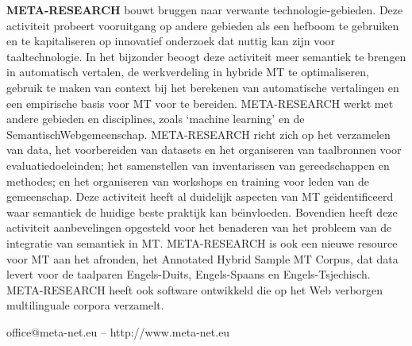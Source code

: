 \documentclass[]{../../metanetpaper}
\begin{document}
\begin{multicols}{2}
    \textbf{META-RESEARCH} bouwt bruggen naar verwante technologie-gebieden. Deze activiteit probeert vooruitgang op andere gebieden als een hefboom te gebruiken en te kapitaliseren op innovatief onderzoek dat nuttig kan zijn voor taaltechnologie. In het bijzonder beoogt deze activiteit meer semantiek te brengen in automatisch vertalen, de werkverdeling in hybride MT te optimaliseren, gebruik te maken van context bij het berekenen van automatische vertalingen en een empirische basis voor MT voor te bereiden. META-RESEARCH werkt met andere gebieden en disciplines, zoals `machine learning' en de SemantischWebgemeenschap. META-RESEARCH richt zich op het verzamelen van data, het voorbereiden van datasets en het organiseren van taalbronnen voor evaluatiedoeleinden; het samenstellen van inventarissen van gereedschappen en methodes; en het organiseren van workshops en training voor leden van de gemeenschap. Deze activiteit heeft al duidelijk aspecten van MT ge{\"\i}dentificeerd waar semantiek de huidige beste praktijk kan be{\"\i}nvloeden. Bovendien heeft deze activiteit aanbevelingen opgesteld voor het benaderen van het probleem van de integratie van semantiek in MT. META-RESEARCH is ook een nieuwe resource voor MT aan het afronden, het Annotated Hybrid Sample MT Corpus, dat data levert voor de taalparen Engels-Duits, Engels-Spaans en Engels-Tsjechisch. META-RESEARCH heeft ook software ontwikkeld die op het Web verborgen multilinguale corpora verzamelt.

\end{multicols}

\vfill
\centerline{office@meta-net.eu -- http://www.meta-net.eu}


\setcounter{section}{0}
\setcounter{figure}{0}

\cleardoublepage



\end{document}
